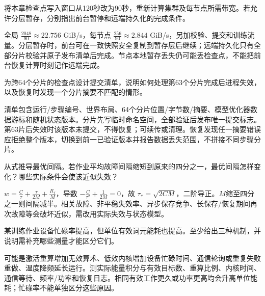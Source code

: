 \begin{exercises}
\begin{exercise} 将本章检查点写入窗口从120秒改为90秒，重新计算集群及每节点所需带宽。若允许分层暂存，分别指出前台暂停和远端持久化的完成条件。

\begin{solution}
全局 $\frac{2048}{90}\approx22.756$ GiB/s，每节点 $\frac{256}{90}\approx2.844$ GiB/s，另加校验、提交和训练流量。分层暂存时，前台可在一致快照安全复制到暂存层后继续；远端持久化只有全部分片校验并原子发布清单后完成。节点本地暂存丢失仍可能丢检查点，不能把前台恢复计算时刻记作远端完成。
\end{solution}
\end{exercise}

\begin{exercise} 为跨64个分片的检查点设计提交清单，说明如何处理第63个分片完成后进程失效，以及恢复时发现一个分片摘要不匹配的情形。

\begin{solution}
清单包含运行/步骤编号、世界布局、64个分片位置/字节数/摘要、模型优化器数据游标和随机状态版本。分片先写临时命名空间，全部验证后发布唯一提交标志。第63片后失效时该版本未提交，不得恢复；可续传或清理。恢复发现任一摘要错误应拒绝整个版本，切换到前一已验证版本并报告数据丢失范围，不拼接不同步骤分片。
\end{solution}
\end{exercise}

\begin{exercise}\optional 从式推导最优间隔。若作业平均故障间隔缩短到原来的四分之一，最优间隔怎样变化？哪些实际条件会使该近似失效？

\begin{solution}
$w=\frac{C}{\tau}+\frac{\tau}{2M}+\frac{R_f}{M}$，导数 $-\frac{C}{\tau^2}+\frac{1}{2M}=0$，故 $\tau_*=\sqrt{2CM}$，二阶导正。$M$缩至四分之一则间隔减半。相关故障、非平稳失效率、异步保存竞争、长保存/恢复期间再次故障等会破坏近似，需改用实际失效与状态模型。
\end{solution}
\end{exercise}

\begin{exercise}\optional 某训练作业设备忙碌率提高，但单位有效词元能耗也提高。至少给出三种机制，并说明需补充哪些测量才能区分它们。

\begin{solution}
可能是激活重算增加无效算术、低效内核增加设备忙碌时间、通信轮询或重复失败重做、温度降频延长运行。测实际能量积分与有效目标数、重算比例、内核时间、通信等待、频率/功率和恢复日志。相同有效工作更久或功率更高均会升高单位能耗；忙碌率不能单独区分这些原因。
\end{solution}
\end{exercise}


\end{exercises}
